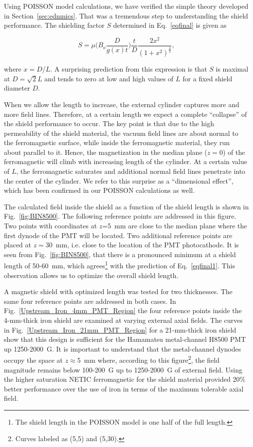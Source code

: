 \documentclass[12pt]{article}
\begin{document}
Using POISSON model calculations, we have verified the simple theory developed in 
Section~\ref{sec:ednmics}. That was a tremendous step to understanding the 
shield performance. The shielding factor $S$ determined in Eq.~\ref{eqfinal} is 
given as

\begin{equation}
S=\mu\bigg(B_o \frac{D}{g(x)t}\bigg) \frac{t }{D} \frac{2x^2}{(1+x^2)^{\frac{3}{2}}},
\label{eqfinal1}
\end{equation}

\noindent
where $x=D/L$. A surprising prediction from this expression is that $S$ is maximal 
at $D =\sqrt{2}L$ and tends to zero at low and  high values of $L$ for a fixed 
shield diameter $D$. 

When we allow the length to increase, the external cylinder captures more and more 
field lines. Therefore, at a certain length we expect a complete ``collapse'' of 
the shield performance to occur. The key point is that due to the high permeability 
of the shield material, the vacuum field lines are about normal to the ferromagnetic 
surface, while inside the ferromagnetic material, they run about parallel to it. 
Hence, the magnetization in the median plane ($z=0$) of the ferromagnetic will climb 
with increasing length of the cylinder. At a certain value of $L$, the ferromagnetic 
saturates and additional normal field lines penetrate into the center of the cylinder. 
We refer to this surprise as a ``dimensional effect'', which has been confirmed in our 
POISSON calculations as well.

The calculated field inside the shield as a function of the shield length is shown in
Fig.~\ref{fig:BIN8500}. The following reference points are addressed in this figure. 
Two points with coordinates at $z$=5~mm are close to the median plane where the first 
dynode of the PMT will be located. Two additional reference points are placed at 
$z=30$~mm, i.e. close to the location of the PMT photocathode. It is seen from 
Fig.~\ref{fig:BIN8500}, that there is a pronounced minimum at a shield length 
of 50-60~mm, which agrees\footnote{The shield length in the POISSON model is one half 
of the full length.} with the prediction of Eq.~\ref{eqfinal1}. This observation allows 
us to optimize the overall shield length.

A magnetic shield with optimized length was tested for two thicknesses. The same 
four reference points are addressed in both cases. In 
Fig.~\ref{Upstream_Iron_4mm_PMT_Region} the four reference points inside the 
4-mm-thick iron shield are examined at varying external axial fields. The curves 
in Fig.~\ref{Upstream_Iron_21mm_PMT_Region} for a 21-mm-thick iron shield show that 
this design is sufficient for the Hamamatsu metal-channel H8500 PMT up 1250-2000~G. 
It is important to understand that the metal-channel dynodes occupy the space at 
$z$$\approx$5~mm where, according to this figure\footnote{Curves labeled as (5,5) 
and (5,30).}, the field magnitude remains below 100-200~G up to 1250-2000~G of 
external field. Using the higher saturation NETIC ferromagnetic for the shield
material provided 20\% better performance over the use of iron in terms of the
maximum tolerable axial field.
\end{document}
